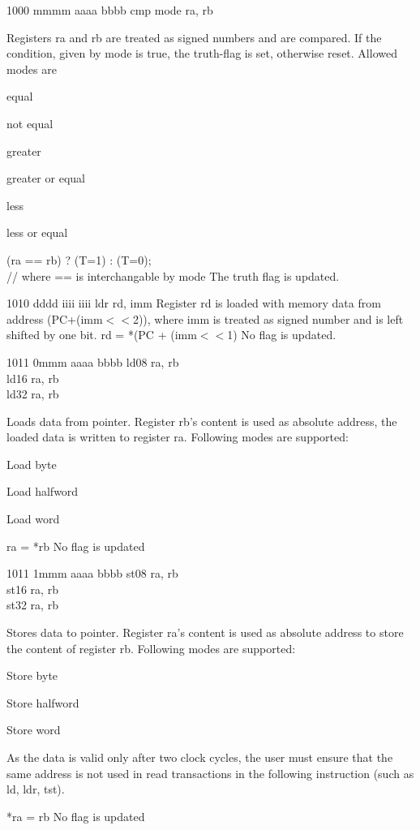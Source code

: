 	{1000 mmmm aaaa bbbb}
	{cmp mode ra, rb}
	{Registers ra and rb are treated as signed numbers and are compared. If the condition, given by mode is true, the truth-flag is set, otherwise reset. Allowed modes are\begin{description}\nolistskip
	\item[0000, eq]equal
	\item[1000, neq]not equal
	\item[0010, gg]greater
	\item[0001, ge]greater or equal
	\item[1001, ll]less
	\item[1010, le]less or equal
	\end{description}}
	{(ra == rb) ? (T=1) : (T=0);\\// where == is interchangable by mode}
	{The truth flag is updated.}

	{1010 dddd iiii iiii}
	{ldr rd, imm}
	{Register rd is loaded with memory data from address (PC+(imm$<<$2)), where imm is treated as signed number and is left shifted by one bit.}
	{rd = *(PC + (imm$<<$1)}
	{No flag is updated.}

	{1011 0mmm aaaa bbbb}
	{ld08 ra, rb\\ld16 ra, rb\\ld32 ra, rb}
	{Loads data from pointer. Register rb's content is used as absolute address, the loaded data is written to register ra. Following modes are supported:
	\begin{description}
	\nolistskip
	\item[000] Load byte
	\item[001] Load halfword
	\item[010] Load word
\end{description}		
	}
	{ra = *rb}
	{No flag is updated}
	
	{1011 1mmm aaaa bbbb}
	{st08 ra, rb\\st16 ra, rb\\st32 ra, rb}
	{Stores data to pointer. Register ra's content is used as absolute address to store the content of register rb. Following modes are supported:
	\begin{description}
	\nolistskip
	\item[000] Store byte
	\item[001] Store halfword
	\item[010] Store word
\end{description}
	As the data is valid only after two clock cycles, the user must ensure that the same address is not used in read transactions in the following instruction (such as ld, ldr, tst). 
	}
	{*ra = rb}
	{No flag is updated}

